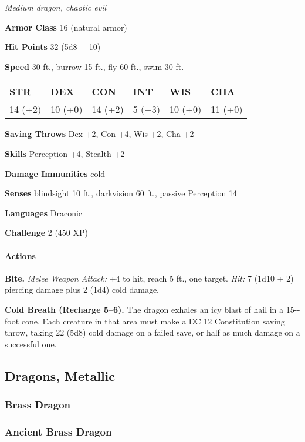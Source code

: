 \documentclass[
]{article}
\begin{document}
\emph{Medium dragon, chaotic evil}

\textbf{Armor Class} 16 (natural armor)

\textbf{Hit Points} 32 (5d8 + 10)

\textbf{Speed} 30 ft., burrow 15 ft., fly 60 ft., swim 30 ft.

\begin{longtable}[]{@{}llllll@{}}
\toprule
STR & DEX & CON & INT & WIS & CHA\tabularnewline
\midrule
\endhead
14 (+2) & 10 (+0) & 14 (+2) & 5 (−3) & 10 (+0) & 11 (+0)\tabularnewline
\bottomrule
\end{longtable}

\textbf{Saving Throws} Dex +2, Con +4, Wis +2, Cha +2

\textbf{Skills} Perception +4, Stealth +2

\textbf{Damage Immunities} cold

\textbf{Senses} blindsight 10 ft., darkvision 60 ft., passive Perception
14

\textbf{Languages} Draconic

\textbf{Challenge} 2 (450 XP)

\hypertarget{actions-42}{%
\paragraph{Actions}\label{actions-42}}

\textbf{Bite.} \emph{Melee Weapon Attack:} +4 to hit, reach 5 ft., one
target. \emph{Hit:} 7 (1d10 + 2) piercing damage plus 2 (1d4) cold
damage.

\textbf{Cold Breath (Recharge 5--6).} The dragon exhales an icy blast of
hail in a 15-­‐foot cone. Each creature in that area must make a DC 12
Constitution saving throw, taking 22 (5d8) cold damage on a failed save,
or half as much damage on a successful one.

\hypertarget{dragons-metallic}{%
\subsection{Dragons, Metallic}\label{dragons-metallic}}

\hypertarget{brass-dragon}{%
\subsubsection{Brass Dragon}\label{brass-dragon}}

\hypertarget{ancient-brass-dragon}{%
\subsubsection{Ancient Brass Dragon}\label{ancient-brass-dragon}}
\end{document}
